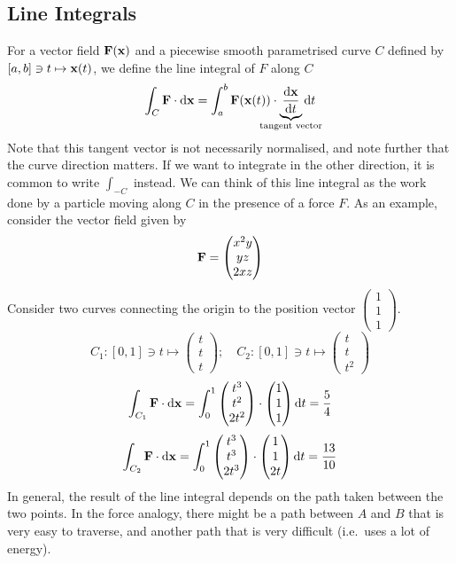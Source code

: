 \subsection{Line Integrals}
For a vector field \(\vb F(\vb x)\) and a piecewise smooth parametrised curve \(C\) defined by \([a, b] \ni t \mapsto \vb x(t)\), we define the line integral of \(F\) along \(C\)
\[ \int_C \vb F \cdot \dd \vb x = \int_a^b \vb F(\vb x(t)) \cdot \underbrace{\frac{\dd \vb x}{\dd{t}}}_{\mathclap{\text{tangent vector}}} \dd{t} \]
Note that this tangent vector is not necessarily normalised, and note further that the curve direction matters. If we want to integrate in the other direction, it is common to write \(\int_{-C}\) instead. We can think of this line integral as the work done by a particle moving along \(C\) in the presence of a force \(F\). As an example, consider the vector field given by
\[ \vb F = \begin{pmatrix}
		x^2 y \\ yz \\ 2xz
	\end{pmatrix} \]
Consider two curves connecting the origin to the position vector \(\begin{pmatrix}
	1 \\ 1 \\ 1
\end{pmatrix}\).
\[ C_1 \colon [0, 1] \ni t \mapsto \begin{pmatrix}
		t \\ t \\ t
	\end{pmatrix};\quad C_2 \colon [0, 1] \ni t \mapsto \begin{pmatrix}
		t \\ t \\ t^2
	\end{pmatrix} \]
\[ \int_{C_1}\vb F \cdot \dd \vb x = \int_0^1 \begin{pmatrix}
		t^3 \\ t^2 \\ 2t^2
	\end{pmatrix} \cdot \begin{pmatrix}
		1 \\ 1 \\ 1
	\end{pmatrix} \dd{t} = \frac{5}{4} \]
\[ \int_{C_2}\vb F \cdot \dd \vb x = \int_0^1 \begin{pmatrix}
		t^3 \\ t^3 \\ 2t^3
	\end{pmatrix} \cdot \begin{pmatrix}
		1 \\ 1 \\ 2t
	\end{pmatrix} \dd{t} = \frac{13}{10} \]
In general, the result of the line integral depends on the path taken between the two points. In the force analogy, there might be a path between \(A\) and \(B\) that is very easy to traverse, and another path that is very difficult (i.e.\ uses a lot of energy).

